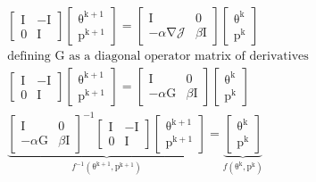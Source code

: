 \documentclass[12pt,letterpaper]{article} %
\newcommand{\bs}[1]{\bm{\mathrm{#1}}} %
\begin{document}
\begin{align*}
\begin{bmatrix} \bs{I} & \bs{-I}\\ \bs{0} & \bs{I} \end{bmatrix} \begin{bmatrix} \bs{\theta^{k+1}}\\ \bs{p^{k+1}}\end{bmatrix} = \begin{bmatrix} \bs{I} & \bs{0}\\ -\alpha\bs{\nabla\mathcal{J}} & \beta\bs{I}\end{bmatrix} \begin{bmatrix} \bs{\theta^{k}}\\ \bs{p^{k}}\end{bmatrix}\\
\text{defining $\bs{G}$ as a diagonal operator matrix of derivatives}\\
\begin{bmatrix} \bs{I} & \bs{-I}\\ \bs{0} & \bs{I} \end{bmatrix} \begin{bmatrix} \bs{\theta^{k+1}}\\ \bs{p^{k+1}}\end{bmatrix} = \begin{bmatrix} \bs{I} & \bs{0}\\ -\alpha\bs{G} & \beta\bs{I}\end{bmatrix} \begin{bmatrix} \bs{\theta^{k}}\\ \bs{p^{k}}\end{bmatrix}\\
\underbrace{\begin{bmatrix} \bs{I} & \bs{0}\\ -\alpha\bs{G} & \beta\bs{I}\end{bmatrix}^{-1}\begin{bmatrix} \bs{I} & \bs{-I}\\ \bs{0} & \bs{I} \end{bmatrix} \begin{bmatrix} \bs{\theta^{k+1}}\\ \bs{p^{k+1}}\end{bmatrix}}_\text{$f^{-1}(\bs{\theta^{k+1}},\bs{p^{k+1}})$} = \underbrace{ \begin{bmatrix} \bs{\theta^{k}}\\ \bs{p^{k}}\end{bmatrix}}_\text{$f(\bs{\theta^{k}},\bs{p^{k}})$}
\end{align*}
\end{document}
